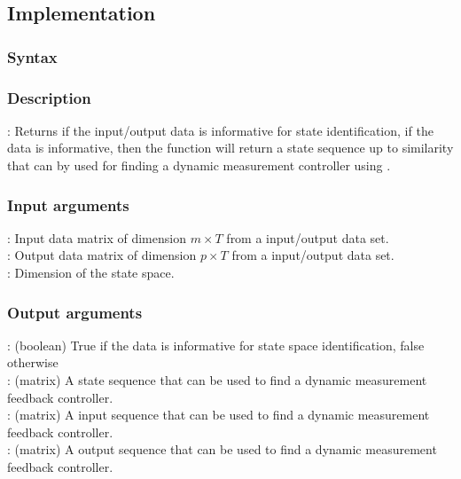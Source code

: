 \subsection{Implementation}
\subsubsection*{Syntax}

\subsubsection*{Description}
: Returns if the input/output data is informative for state identification, if the data is informative, then the function will return a state sequence up to similarity that can by used for finding a dynamic measurement controller using .

\subsubsection*{Input arguments}
\textbf{}: Input data matrix of dimension $m \times T$ from a input/output data set.\\
\textbf{}: Output data matrix of dimension $p \times T$ from a input/output data set.\\
\textbf{}: Dimension of the state space.

\subsubsection*{Output arguments}
\textbf{}: (boolean) True if the data is informative for state space identification, false otherwise\\
\textbf{}: (matrix) A state sequence that can be used to find a dynamic measurement feedback controller.\\
\textbf{}: (matrix) A input sequence that can be used to find a dynamic measurement feedback controller.\\
\textbf{}: (matrix) A output sequence that can be used to find a dynamic measurement feedback controller.

